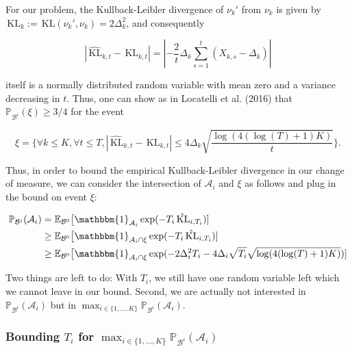 \documentclass[11pt,]{article}
\newcommand{\KL}{\,\text{KL}}
\begin{document}
For our problem, the Kullback-Leibler divergence of \(\nu_k'\) from
\(\nu_k\) is given by \(\KL_k := \KL(\nu_k', \nu_k) = 2\Delta_k^2\), and
consequently

\begin{equation*}
|\hat{\KL}_{k,t} - \KL_{k,t}| = |-\frac{2}{t} \Delta_k \sum_{s=1}^{t}(X_{k,s} - \Delta_k)|
\end{equation*}

itself is a normally distributed random variable with mean zero and a
variance decreasing in \(t\). Thus, one can show as in Locatelli et al.
(2016) that \(\mathbb{P}_{\mathcal{B}^i}(\xi) \geq 3/4\) for the event

\begin{equation}
\xi = \{ \forall k \leq K, \forall t \leq T, |\hat{\KL}_{k,t} - \KL_{k,t}| \leq 4 \Delta_k \sqrt{\frac{\log(4(\log(T)+1)K)}{t}}\}. \label{LocatelliTheorem1EventXi}
\end{equation}

Thus, in order to bound the empirical Kullback-Leibler divergence in our
change of measure, we can consider the intersection of \(\mathcal{A}_i\)
and \(\xi\) as follows and plug in the bound on event \(\xi\):

\begin{align*}
\mathbb{P}_{\mathcal{B}^i}(\mathcal{A}_i) & = \mathbb{E}_{\mathcal{B}^0} \big[\mathbbm{1}_{\mathcal{A}_i} \exp (- T_i \hat{\KL}_{i,T_i}) ] \\
& \geq \mathbb{E}_{\mathcal{B}^0} \big[\mathbbm{1}_{\mathcal{A}_i \cap \xi} \exp (- T_i \hat{\KL}_{i,T_i}) ] \\
& \geq \mathbb{E}_{\mathcal{B}^0} \big[\mathbbm{1}_{\mathcal{A}_i \cap \xi} \exp (- 2 \Delta_i^2 T_i - 4 \Delta_i \sqrt{T_i} \sqrt{\log(4(\log(T)+1)K)}) ]
\end{align*}

Two things are left to do: With \(T_i\), we still have one random
variable left which we cannot leave in our bound. Second, we are
actually not interested in \(\mathbb{P}_{\mathcal{B}^i}(\mathcal{A}_i)\)
but in
\(\max_{i \in \{1,\dots,K\}} \mathbb{P}_{\mathcal{B}^i}(\mathcal{A}_i)\).

\subsubsection{\texorpdfstring{Bounding \(T_i\) for
\(\max_{i \in \{1,\dots,K\}}\mathbb{P}_{\mathcal{B}^i}(\mathcal{A}_i)\)}{Bounding T\_i for \textbackslash{}max\_\{i \textbackslash{}in \textbackslash{}\{1,\textbackslash{}dots,K\textbackslash{}\}\}\textbackslash{}mathbb\{P\}\_\{\textbackslash{}mathcal\{B\}\^{}i\}(\textbackslash{}mathcal\{A\}\_i)}}\label{bounding-t_i-for-max_i-in-1dotskmathbbp_mathcalbimathcala_i}
\end{document}
